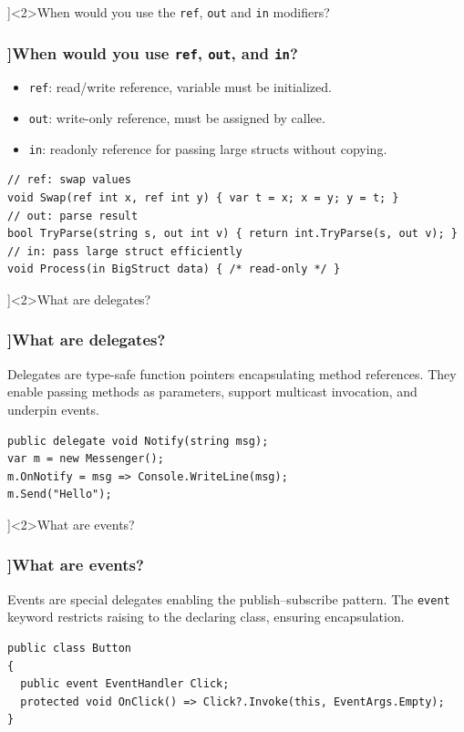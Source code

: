 \QuestionSlide[\CategoryBadge[LangColor!20]{Language Feature}]<2>{When would you use the \texttt{ref}, \texttt{out} and \texttt{in} modifiers?}
\begin{frame}[fragile]
  \frametitle{\AnswerTitle[\CategoryBadge[LangColor!20]{Language Feature}]{When would you use \texttt{ref}, \texttt{out}, and \texttt{in}?}}

  {\footnotesize
    \begin{itemize}
      \item \texttt{ref}: read/write reference, variable must be initialized.
      \item \texttt{out}: write-only reference, must be assigned by callee.
      \item \texttt{in}: readonly reference for passing large structs without copying.
    \end{itemize}
  }

  \begin{verbatim}
// ref: swap values
void Swap(ref int x, ref int y) { var t = x; x = y; y = t; }
// out: parse result
bool TryParse(string s, out int v) { return int.TryParse(s, out v); }
// in: pass large struct efficiently
void Process(in BigStruct data) { /* read-only */ }
  \end{verbatim}
\end{frame}

\QuestionSlide[\CategoryBadge[LangColor!20]{Language Feature}]<2>{What are delegates?}
\begin{frame}[fragile]
  \frametitle{\AnswerTitle[\CategoryBadge[LangColor!20]{Language Feature}]{What are delegates?}}

  {\footnotesize
    Delegates are type-safe function pointers encapsulating method references. They enable passing methods as parameters, support multicast invocation, and underpin events.
  }

  \begin{verbatim}
public delegate void Notify(string msg);
var m = new Messenger();
m.OnNotify = msg => Console.WriteLine(msg);
m.Send("Hello");
  \end{verbatim}
\end{frame}

\QuestionSlide[\CategoryBadge[LangColor!20]{Language Feature}]<2>{What are events?}
\begin{frame}[fragile]
  \frametitle{\AnswerTitle[\CategoryBadge[LangColor!20]{Language Feature}]{What are events?}}

  {\footnotesize
    Events are special delegates enabling the publish–subscribe pattern. The \texttt{event} keyword restricts raising to the declaring class, ensuring encapsulation.
  }

  \begin{verbatim}
public class Button
{
  public event EventHandler Click;
  protected void OnClick() => Click?.Invoke(this, EventArgs.Empty);
}
  \end{verbatim}
\end{frame}

